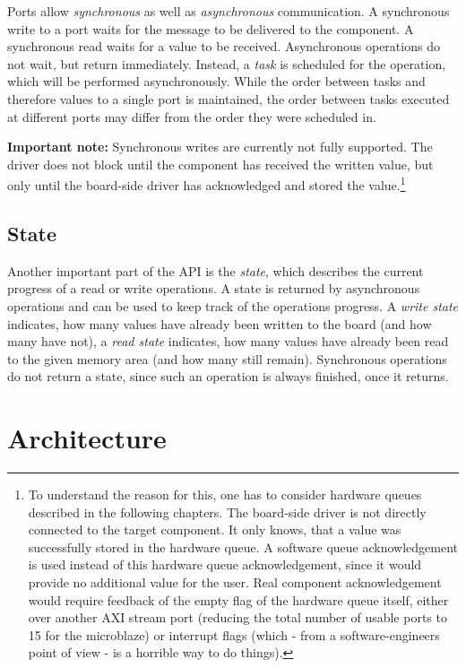 \documentclass{report}
\begin{document}
Ports allow \textit{synchronous} as well as \textit{asynchronous} communication. A synchronous write to a port waits for the message to be delivered to the component. A synchronous read waits for a value to be received. Asynchronous operations do not wait, but return immediately. Instead, a \textit{task} is scheduled for the operation, which will be performed asynchronously. While the order between tasks and therefore values to a single port is maintained, the order between tasks executed at different ports may differ from the order they were scheduled in.

\textbf{Important note:} Synchronous writes are currently not fully supported. The driver does not block until the component has received the written value, but only until the board-side driver has acknowledged and stored the value.\footnote{To understand the reason for this, one has to consider hardware queues described in the following chapters. The board-side driver is not directly connected to the target component. It only knows, that a value was successfully stored in the hardware queue. A software queue acknowledgement is used instead of this hardware queue acknowledgement, since it would provide no additional value for the user. Real component acknowledgement would require feedback of the empty flag of the hardware queue itself, either over another AXI stream port (reducing the total number of usable ports to 15 for the microblaze) or interrupt flags (which - from a software-engineers point of view - is a horrible way to do things).}

\subsection{State}
\label{sec:api:state}
Another important part of the API is the \textit{state}, which describes the current progress of a read or write operations. A state is returned by asynchronous operations and can be used to keep track of the operations progress. A \textit{write state} indicates, how many values have already been written to the board (and how many have not), a \textit{read state} indicates, how many values have already been read to the given memory area (and how many still remain).
Synchronous operations do not return a state, since such an operation is always finished, once it returns.

\section{Architecture}
\label{sec:arch}
\end{document}
